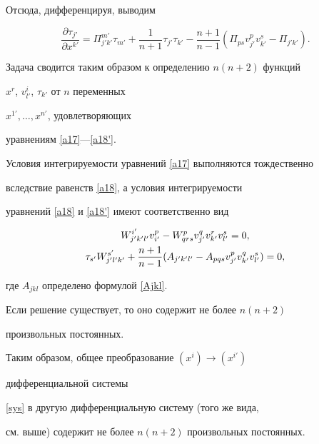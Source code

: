 Отсюда, дифференцируя, выводим


\begin{equation}\label{a18'}


\frac{\partial\tau_{j'}}{\partial x^{k'}}=\Pi^{m'}_{j'k'}\tau_{m'}+


\frac{1}{n+1} \tau_{j'}\tau_{k'}-\frac{n+1}{n-1}


(\Pi_{ps}v^p_{j'}v^s _{k'}-\Pi_{j'k'}).


\end{equation}


Задача сводится таким образом к определению $n(n+2)$ функций


$x^r$, $v^i_{l'}$, $\tau_{k'}$ от $n$ переменных


$x^{1'},\dotsc,x^{n'}$, удовлетворяющих


уравнениям \eqref{a17}---\eqref{a18'}.


Условия интегрируемости уравнений \eqref{a17} выполняются тождественно


вследствие равенств \eqref{a18}, а условия интегрируемости


уравнений \eqref{a18} и \eqref{a18'} имеют соответственно вид


\begin{gather}\label{a16'}


W^{i'}_{j'k'l'}v^p_{i'}-W^p_{qrs}{v^{q} _{j'}}v^r_{k'}v^s_{l'}=0, \\


%


\label{a16''}


\tau_{s'}W^{s'}_{j'l'k'}+


{\displaystyle n+1\over \displaystyle n-1}


(A_{j'k'l'}-A_{pqs}v^p_{j'}v^q_{k'}v^s_{l'})=0,


\end{gather}


где $A_{jkl}$ определено формулой \eqref{Ajkl}.


Если решение существует, то оно содержит не более $n(n+2)$


произвольных постоянных.





Таким образом, общее преобразование $(x^i)\to (x^{i'})$


дифференциальной системы 


\eqref{sys} в другую дифференциальную систему (того же вида,


см. выше) содержит не более $n(n+2)$ произвольных постоянных.





